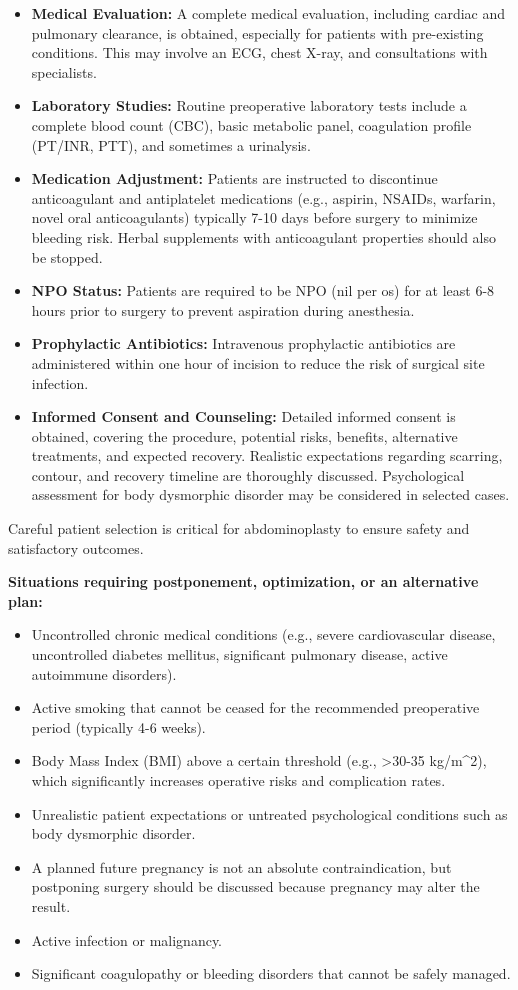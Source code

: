 \begin{itemize}
  \item \textbf{Medical Evaluation:} A complete medical evaluation, including cardiac and pulmonary clearance, is obtained, especially for patients with pre-existing conditions. This may involve an ECG, chest X-ray, and consultations with specialists.
  \item \textbf{Laboratory Studies:} Routine preoperative laboratory tests include a complete blood count (CBC), basic metabolic panel, coagulation profile (PT/INR, PTT), and sometimes a urinalysis.
  \item \textbf{Medication Adjustment:} Patients are instructed to discontinue anticoagulant and antiplatelet medications (e.g., aspirin, NSAIDs, warfarin, novel oral anticoagulants) typically 7-10 days before surgery to minimize bleeding risk. Herbal supplements with anticoagulant properties should also be stopped.
  \item \textbf{NPO Status:} Patients are required to be NPO (nil per os) for at least 6-8 hours prior to surgery to prevent aspiration during anesthesia.
  \item \textbf{Prophylactic Antibiotics:} Intravenous prophylactic antibiotics are administered within one hour of incision to reduce the risk of surgical site infection.
  \item \textbf{Informed Consent and Counseling:} Detailed informed consent is obtained, covering the procedure, potential risks, benefits, alternative treatments, and expected recovery. Realistic expectations regarding scarring, contour, and recovery timeline are thoroughly discussed. Psychological assessment for body dysmorphic disorder may be considered in selected cases.
\end{itemize}

Careful patient selection is critical for abdominoplasty to ensure safety and satisfactory outcomes.

\textbf{Situations requiring postponement, optimization, or an alternative plan:}
\begin{itemize}
  \item Uncontrolled chronic medical conditions (e.g., severe cardiovascular disease, uncontrolled diabetes mellitus, significant pulmonary disease, active autoimmune disorders).
  \item Active smoking that cannot be ceased for the recommended preoperative period (typically 4-6 weeks).
  \item Body Mass Index (BMI) above a certain threshold (e.g., >30-35 kg/m\textasciicircum2), which significantly increases operative risks and complication rates.
  \item Unrealistic patient expectations or untreated psychological conditions such as body dysmorphic disorder.
  \item A planned future pregnancy is not an absolute contraindication, but postponing surgery should be discussed because pregnancy may alter the result.
  \item Active infection or malignancy.
\item Significant coagulopathy or bleeding disorders that cannot be safely managed.
\end{itemize}

